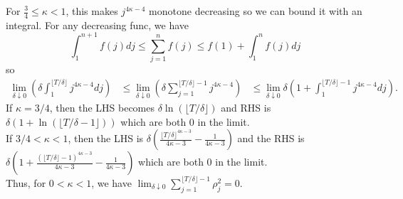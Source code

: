 \documentclass{article}
\begin{document}
For $\frac{3}{4}\leq \kappa<1$, this makes $j^{4\kappa-4}$ monotone decreasing so we can bound it with an integral. For any decreasing func, we have
$$\int_1^{n+1} f(j) dj\leq \sum_{j=1}^n f(j)\leq f(1)+\int_1^n  f(j)dj$$
so
\begin{align*}
    \lim_{\delta\downarrow 0}\left(\delta\int_1^{\lfloor T/\delta\rfloor}j^{4\kappa-4}dj\right)
    &\leq\lim_{\delta\downarrow 0}\left(\delta\sum_{j=1}^{\lfloor T/\delta\rfloor-1} j^{4\kappa-4}\right)
    &\leq \lim_{\delta\downarrow 0}\delta\left(1+\int_1^{\lfloor T/\delta \rfloor-1}j^{4\kappa-4}dj\right).
\end{align*}
If $\kappa = 3/4$, then the LHS becomes $\delta\ln(\lfloor T/\delta\rfloor)$ and RHS is $\delta\left(1+\ln(\lfloor T/\delta-1\rfloor)\right)$ which are both 0 in the limit.\\
If $3/4<\kappa<1$, then the LHS is $\delta \left(\frac{\lfloor T/\delta\rfloor^{4\kappa-3}}{4\kappa-3}-\frac{1}{4\kappa-3}\right)$ and the RHS is $\delta \left(1+\frac{(\lfloor T/\delta\rfloor-1)^{4\kappa-3}}{4\kappa-3}-\frac{1}{4\kappa-3}\right)$ which are both 0 in the limit. \\
Thus, for $0<\kappa<1$, we have $\lim_{\delta\downarrow 0}\sum_{j=1}^{\lfloor T/\delta\rfloor -1}\rho_j^2=0$.\\ 


\color{black}

\medskip
\end{document}
